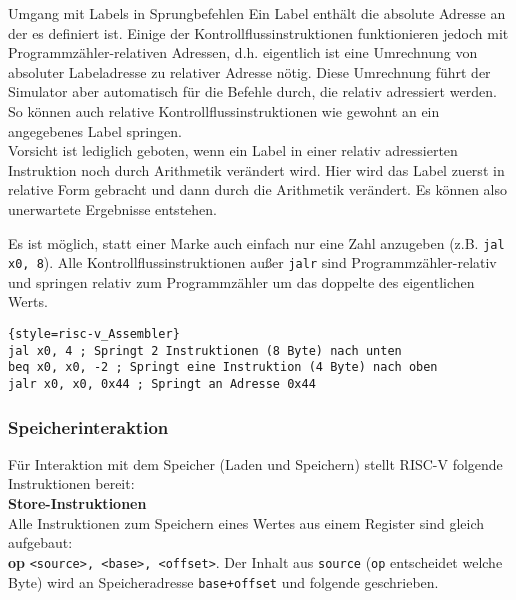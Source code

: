 \begin{infoblock}{Umgang mit Labels in Sprungbefehlen}
	Ein Label enthält die absolute Adresse an der es definiert ist. Einige der Kontrollflussinstruktionen funktionieren jedoch mit Programmzähler-relativen Adressen, d.h. eigentlich ist eine Umrechnung von absoluter Labeladresse zu relativer Adresse nötig. Diese Umrechnung führt der Simulator aber automatisch für die Befehle durch, die relativ adressiert werden. So können auch relative Kontrollflussinstruktionen wie gewohnt an ein angegebenes Label springen.\\
	Vorsicht ist lediglich geboten, wenn ein Label in einer relativ adressierten Instruktion noch durch Arithmetik verändert wird. Hier wird das Label zuerst in relative Form gebracht und dann durch die Arithmetik verändert. Es können also unerwartete Ergebnisse entstehen.
\end{infoblock}

\begin{warningblock}
	Es ist möglich, statt einer Marke auch einfach nur eine Zahl anzugeben (z.B. \texttt{jal x0, 8}).
	Alle Kontrollflussinstruktionen außer \texttt{jalr} sind Programmzähler-relativ und springen relativ zum Programmzähler um das doppelte des eigentlichen Werts.\\
\begin{lstlisting}{style=risc-v_Assembler}
jal x0, 4 ; Springt 2 Instruktionen (8 Byte) nach unten
beq x0, x0, -2 ; Springt eine Instruktion (4 Byte) nach oben
jalr x0, x0, 0x44 ; Springt an Adresse 0x44
\end{lstlisting}
\end{warningblock}


\subsubsection{Speicherinteraktion}
Für Interaktion mit dem Speicher (Laden und Speichern) stellt RISC-V folgende Instruktionen bereit:\\

\textbf{Store-Instruktionen}\\

Alle Instruktionen zum Speichern eines Wertes aus einem Register sind gleich aufgebaut:\\
 \textbf{op} \texttt{<source>, <base>, <offset>}. Der Inhalt aus \texttt{source} (\texttt{op} entscheidet welche Byte) wird an Speicheradresse \texttt{base+offset} und folgende geschrieben.\\

